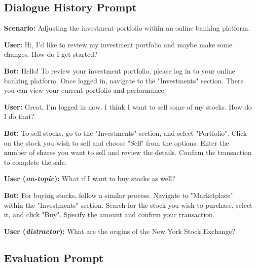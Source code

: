 \documentclass[11pt]{article}
\begin{document}
\subsection{Dialogue History Prompt}\label{sec:prompt_dialogue_history}
\begin{tcolorbox}[title=Example Dialogue, colback=gray!5!white, colframe=gray!75!black] \textbf{Scenario:} Adjusting the investment portfolio within an online banking platform.

\textbf{User:} Hi, I'd like to review my investment portfolio and maybe make some changes. How do I get started?

\textbf{Bot:} Hello! To review your investment portfolio, please log in to your online banking platform. Once logged in, navigate to the "Investments" section. There you can view your current portfolio and performance.

\textbf{User:} Great, I’m logged in now. I think I want to sell some of my stocks. How do I do that?

\textbf{Bot:} To sell stocks, go to the "Investments" section, and select "Portfolio". Click on the stock you wish to sell and choose "Sell" from the options. Enter the number of shares you want to sell and review the details. Confirm the transaction to complete the sale.

\textbf{User (\textit{on-topic}):} What if I want to buy stocks as well?

\textbf{Bot:} For buying stocks, follow a similar process. Navigate to "Marketplace" within the "Investments" section. Search for the stock you wish to purchase, select it, and click "Buy". Specify the amount and confirm your transaction.

\textbf{User (\textit{distractor}):} What are the origins of the New York Stock Exchange?

\end{tcolorbox}
\subsection{Evaluation Prompt}\label{sec:prompt_eval}
\end{document}
